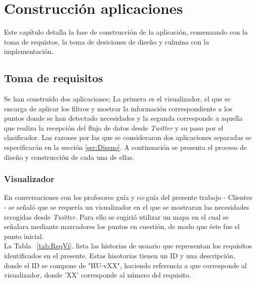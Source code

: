 \chapter{Construcción aplicaciones}
\label{cap:Construccion}

Este capítulo detalla la fase de construcción de la aplicación, comenzando con la toma de requistos, la toma de desiciones de diseño y culmina con la implementación.

\section{Toma de requisitos}
\label{sec:Requisitos}

Se han construido dos aplicaciones; La primera es el visualizador, el que se encarga de aplicar los filtros y mostrar la información correspondiente a los puntos donde se han detectado necesidades y la segunda corresponde a aquella que realiza la recepción del flujo de datos desde \textit{Twitter} y su paso por el clasificador. Las razones por las que se consideraron dos aplicaciones separadas se especificarán en la sección \ref{sec:Diseno}. A continuación se presenta el proceso de diseño y construcción de cada una de ellas.

\subsection{Visualizador}
\label{subsec:ReqVisualizador}

En conversaciones con los profesores guía y co-guía del presente trabajo - Clientes - se señaló que se requería un visualizador en el que se mostraran las necesidades recogidas desde \textit{Twitter}. Para ello se sugirió utilizar un mapa en el cual se señalara mediante marcadores los puntos en cuestión, de modo que éste fue el punto inicial.\\

La Tabla ~\ref{tab:ReqVi}. lista las historias de usuario que representan los requisitos identificados en el presente. Estas hisotorias tienen un ID y una descripción, donde el ID se compone de "HU-vXX", haciendo referencia a que corresponde al visualizador, donde 'XX' corresponde al número del requisito.\\

